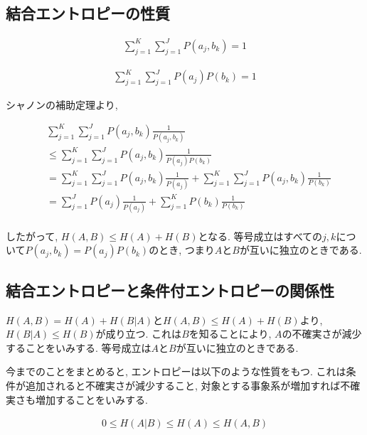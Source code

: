\documentclass[dvipdfmx, 10pt]{jsarticle}
\begin{document}
\subsection*{結合エントロピーの性質}
\begin{align*}
    \sum_{j=1}^{K} \sum_{j=1}^{J} P(a_j, b_k) = 1
\end{align*}

\begin{align*}
    \sum_{j=1}^{K} \sum_{j=1}^{J} P(a_j) P(b_k) = 1
\end{align*}

シャノンの補助定理より, 

\begin{align*}
    & \sum_{j=1}^{K} \sum_{j=1}^{J} P(a_j, b_k) \frac{1}{P(a_j, b_k)} \\
    &\leq \sum_{j=1}^{K} \sum_{j=1}^{J} P(a_j, b_k) \frac{1}{P(a_j) P(b_k)} \\
    &= \sum_{j=1}^{K} \sum_{j=1}^{J} P(a_j, b_k) \frac{1}{P(a_j)} 
    + \sum_{j=1}^{K} \sum_{j=1}^{J} P(a_j, b_k) \frac{1}{P(b_k)} \\
    &= \sum_{j=1}^{J} P(a_j) \frac{1}{P(a_j)} + \sum_{j=1}^{K} P(b_k) \frac{1}{P(b_k)} \\
\end{align*}

したがって, \(H(A,B) \leq H(A) + H(B)\)となる. 等号成立はすべての\(j, k\)について\(P(a_j, b_k) = P(a_j) P(b_k)\)のとき, 
つまり\(A\)と\(B\)が互いに独立のときである. 

\subsection*{結合エントロピーと条件付エントロピーの関係性}
\(H(A, B) = H(A)+ H(B | A)\)と\(H(A,B) \leq H(A) + H(B)\)より, \(H(B | A) \leq H(B)\)が成り立つ. 
これは\(B\)を知ることにより, \(A\)の不確実さが減少することをいみする. 等号成立は\(A\)と\(B\)が互いに独立のときである. 

今までのことをまとめると, エントロピーは以下のような性質をもつ. 
これは条件が追加されると不確実さが減少すること, 対象とする事象系が増加すれば不確実さも増加することをいみする. 

\begin{align*}
    0 \leq H(A | B) \leq H(A) \leq H(A, B)
\end{align*}
\end{document}

